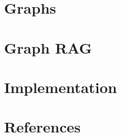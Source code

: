 \section[Intro]{Graphs}


\section[Intro]{Graph RAG}


\section[Impl]{Implementation}


\section[Refs]{References}
